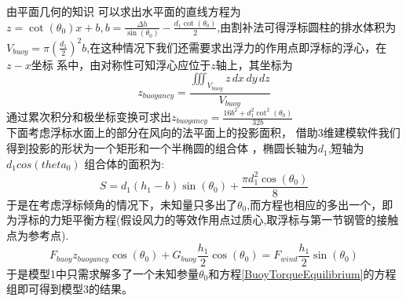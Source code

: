 \documentclass[a4paper,12pt]{ctexart}
\begin{document}
由平面几何的知识
可以求出水平面的直线方程为$z=\cot(\theta_0)x+b,b=\frac{\Delta h}{\sin(\theta_0)}-\frac{d_1 \cot(\theta_0)}{2}$,由割补法可得浮标圆柱的排水体积为$V_{buoy}=\pi (\frac{d_1}{2})^2 b$,在这种情况下我们还需要求出浮力的作用点即浮标的浮心，在$z-x$坐标
系中，由对称性可知浮心应位于$z$轴上，其坐标为
\begin{equation}
z_{buoyancy}=\frac{\iiint_{V_{buoy}} z\,dx\,dy\,dz}{V_{buoy}}
\end{equation}
通过累次积分和极坐标变换可求出$z_{buoyancy}=\frac{16 b^2+d_1^2 \cot^2(\theta_0)}{32b}$\\
下面考虑浮标水面上的部分在风向的法平面上的投影面积，
借助3维建模软件我们得到投影的形状为一个矩形和一个半椭圆的组合体
，椭圆长轴为$d_1$,短轴为$d_1 cos(theta_0)$
组合体的面积为:
\begin{equation}
S=d_1(h_1-b)\sin(\theta_0)+\frac{\pi d_1^2 \cos(\theta_0)}{8}
\end{equation}
于是在考虑浮标倾角的情况下，未知量只多出了$\theta_0$,而方程也相应的多出一个，即为浮标的力矩平衡方程(假设风力的等效作用点过质心,取浮标与第一节钢管的接触点为参考点).
\begin{equation}\label{BuoyTorqueEquilibrium}
F_{buoy}z_{buoyancy}\cos(\theta_0)+G_{buoy}\frac{h_1}{2}\cos(\theta_0)=F_{wind}\frac{h_1}{2}\sin(\theta_0)
\end{equation}
于是模型1中只需求解多了一个未知参量$\theta_0$和方程\ref{BuoyTorqueEquilibrium}的方程组即可得到模型3的结果。
\end{document}
